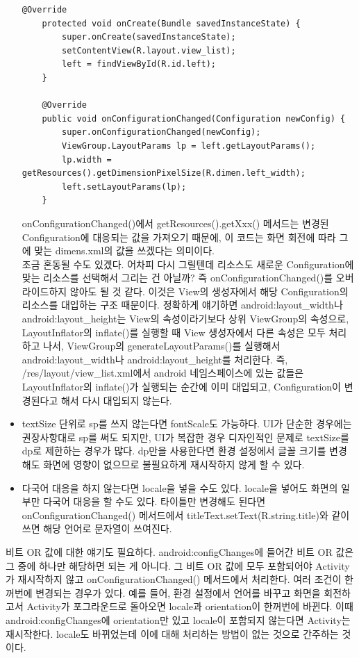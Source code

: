 \begin{itemize}
\begin{lstlisting}[frame=single]
	@Override
	protected void onCreate(Bundle savedInstanceState) {
		super.onCreate(savedInstanceState);
		setContentView(R.layout.view_list);
		left = findViewById(R.id.left);
	}

	@Override
	public void onConfigurationChanged(Configuration newConfig) {
		super.onConfigurationChanged(newConfig);
		ViewGroup.LayoutParams lp = left.getLayoutParams();
		lp.width = getResources().getDimensionPixelSize(R.dimen.left_width);
		left.setLayoutParams(lp);
	}
\end{lstlisting}
onConfigurationChanged()에서 getResources().getXxx() 메서드는 변경된 Configuration에 대응되는 값을 가져오기 때문에, 이 코드는 화면 회전에 따라 그에 맞는 dimens.xml의 값을 쓰겠다는 의미이다.\\

조금 혼동될 수도 있겠다. 어차피 다시 그릴텐데 리소스도 새로운 Configuration에 맞는 리소스를 선택해서 그리는 건 아닐까? 
즉 onConfigurationChanged()를 오버라이드하지 않아도 될 것 같다.
이것은 View의 생성자에서 해당 Configuration의 리소스를 대입하는 구조 때문이다. 
정확하게 얘기하면 android:layout\_width나 android:layout\_height는 View의 속성이라기보다 상위 ViewGroup의 속성으로, LayoutInflator의 inflate()를 실행할 때 View 생성자에서 다른 속성은 모두 처리하고 나서, ViewGroup의 generateLayoutParams()를 실행해서 android:layout\_width나 android:layout\_height를 처리한다.
즉, /res/layout/view\_list.xml에서 android 네임스페이스에 있는 값들은 LayoutInflator의 inflate()가 실행되는 순간에 이미 대입되고, Configuration이 변경된다고 해서 다시 대입되지 않는다. 
	
\item textSize 단위로 sp를 쓰지 않는다면 fontScale도 가능하다. UI가 단순한 경우에는 권장사항대로 sp를 써도 되지만, UI가 복잡한 경우 디자인적인 문제로 textSize를 dp로 제한하는 경우가 많다. dp만을 사용한다면 환경 설정에서 글꼴 크기를 변경해도 화면에 영향이 없으므로 불필요하게 재시작하지 않게 할 수 있다.

\item 다국어 대응을 하지 않는다면 locale을 넣을 수도 있다. locale을 넣어도 화면의 일부만 다국어 대응을 할 수도 있다. 
타이틀만 변경해도 된다면 onConfigurationChanged() 메서드에서 titleText.setText(R.string.title)와 같이 쓰면 해당 언어로 문자열이 쓰여진다.
\end{itemize}

비트 OR 값에 대한 얘기도 필요하다. android:configChanges에 들어간 비트 OR 값은 그 중에 하나만 해당하면 되는 게 아니다. 
그 비트 OR 값에 모두 포함되어야 Activity가 재시작하지 않고 onConfigurationChanged() 메서드에서 처리한다. 
여러 조건이 한꺼번에 변경되는 경우가 있다. 
예를 들어, 환경 설정에서 언어를 바꾸고 화면을 회전하고서 Activity가 포그라운드로 돌아오면 locale과 orientation이 한꺼번에 바뀐다. 
이때 android:configChanges에 orientation만 있고 locale이 포함되지 않는다면 Activity는 재시작한다. locale도 바뀌었는데 이에 대해 처리하는 방법이 없는 것으로 간주하는 것이다.\\

